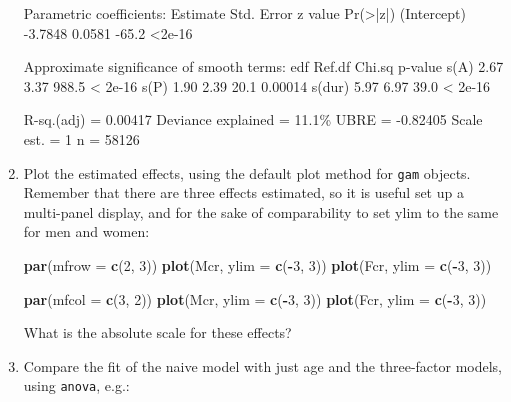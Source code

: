 \documentclass[
]{book}
\newenvironment{Shaded}{\begin{snugshade}}{\end{snugshade}}
\newcommand{\AttributeTok}[1]{\textcolor[rgb]{0.13,0.29,0.53}{#1}}
\newcommand{\DecValTok}[1]{\textcolor[rgb]{0.00,0.00,0.81}{#1}}
\newcommand{\FunctionTok}[1]{\textcolor[rgb]{0.13,0.29,0.53}{\textbf{#1}}}
\newcommand{\NormalTok}[1]{#1}
\newcommand{\SpecialCharTok}[1]{\textcolor[rgb]{0.81,0.36,0.00}{\textbf{#1}}}
\begin{document}
\begin{enumerate}
\begin{Shaded}
\begin{Highlighting}[]
\NormalTok{Parametric coefficients:}
\NormalTok{            Estimate Std. Error z value Pr(\textgreater{}|z|)}
\NormalTok{(Intercept)  {-}3.7848     0.0581   {-}65.2   \textless{}2e{-}16}

\NormalTok{Approximate significance of smooth terms:}
\NormalTok{        edf Ref.df Chi.sq p{-}value}
\NormalTok{s(A)   2.67   3.37  988.5 \textless{} 2e{-}16}
\NormalTok{s(P)   1.90   2.39   20.1 0.00014}
\NormalTok{s(dur) 5.97   6.97   39.0 \textless{} 2e{-}16}

\NormalTok{R{-}sq.(adj) =  0.00417   Deviance explained = 11.1\%}
\NormalTok{UBRE = {-}0.82405  Scale est. = 1         n = 58126}
\end{Highlighting}
\end{Shaded}
\item
  Plot the estimated effects, using the default plot method for
  \texttt{gam} objects. Remember that there are three effects
  estimated, so it is useful set up a multi-panel display, and for
  the sake of comparability to set ylim to the same for men and women:

\begin{Shaded}
\begin{Highlighting}[]
\FunctionTok{par}\NormalTok{(}\AttributeTok{mfrow =} \FunctionTok{c}\NormalTok{(}\DecValTok{2}\NormalTok{, }\DecValTok{3}\NormalTok{))}
\FunctionTok{plot}\NormalTok{(Mcr, }\AttributeTok{ylim =} \FunctionTok{c}\NormalTok{(}\SpecialCharTok{{-}}\DecValTok{3}\NormalTok{, }\DecValTok{3}\NormalTok{))}
\FunctionTok{plot}\NormalTok{(Fcr, }\AttributeTok{ylim =} \FunctionTok{c}\NormalTok{(}\SpecialCharTok{{-}}\DecValTok{3}\NormalTok{, }\DecValTok{3}\NormalTok{))}
\end{Highlighting}
\end{Shaded}

\begin{Shaded}
\begin{Highlighting}[]
\FunctionTok{par}\NormalTok{(}\AttributeTok{mfcol =} \FunctionTok{c}\NormalTok{(}\DecValTok{3}\NormalTok{, }\DecValTok{2}\NormalTok{))}
\FunctionTok{plot}\NormalTok{(Mcr, }\AttributeTok{ylim =} \FunctionTok{c}\NormalTok{(}\SpecialCharTok{{-}}\DecValTok{3}\NormalTok{, }\DecValTok{3}\NormalTok{))}
\FunctionTok{plot}\NormalTok{(Fcr, }\AttributeTok{ylim =} \FunctionTok{c}\NormalTok{(}\SpecialCharTok{{-}}\DecValTok{3}\NormalTok{, }\DecValTok{3}\NormalTok{))}
\end{Highlighting}
\end{Shaded}

  What is the absolute scale for these effects?
\item
  Compare the fit of the naive model with just age and the
  three-factor models, using \texttt{anova}, e.g.:


\end{enumerate}
\end{document}
